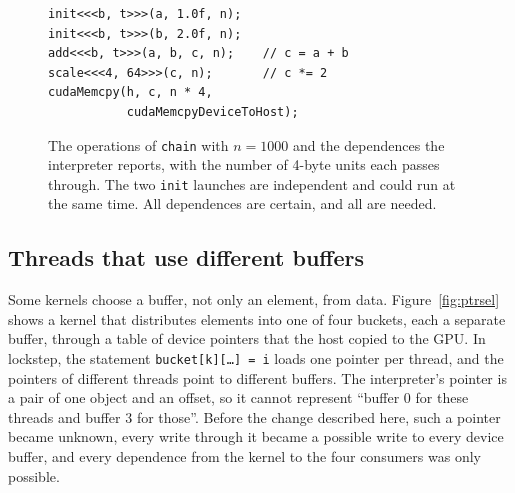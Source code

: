 \documentclass[11pt]{article}
\newcommand{\figref}[1]{Figure~\ref{#1}}
\newcommand{\code}[1]{\texttt{#1}}
\begin{document}
\begin{figure}[tbp]
\centering
\begin{minipage}{0.47\linewidth}
\begin{lstlisting}
init<<<b, t>>>(a, 1.0f, n);
init<<<b, t>>>(b, 2.0f, n);
add<<<b, t>>>(a, b, c, n);    // c = a + b
scale<<<4, 64>>>(c, n);       // c *= 2
cudaMemcpy(h, c, n * 4,
           cudaMemcpyDeviceToHost);
\end{lstlisting}
\end{minipage}\hfill
\begin{minipage}{0.5\linewidth}
\centering
{}
\end{minipage}
\caption{The operations of \code{chain} with $n=1000$ and the dependences the interpreter reports, with the
number of 4-byte units each passes through. The two \code{init} launches are independent and could run at the
same time. All dependences are certain, and all are needed.}
\label{fig:example}
\end{figure}

\subsection{Threads that use different buffers}
\label{sec:split}

Some kernels choose a buffer, not only an element, from data. \figref{fig:ptrsel} shows a kernel that distributes
elements into one of four buckets, each a separate buffer, through a table of device pointers that the host
copied to the GPU. In lockstep, the statement \code{bucket[k][\ldots] = i} loads one pointer per thread, and the
pointers of different threads point to different buffers. The interpreter's pointer is a pair of one object and
an offset, so it cannot represent ``buffer 0 for these threads and buffer 3 for those''. Before the change
described here, such a pointer became unknown, every write through it became a possible write to every device
buffer, and every dependence from the kernel to the four consumers was only possible.
\end{document}
